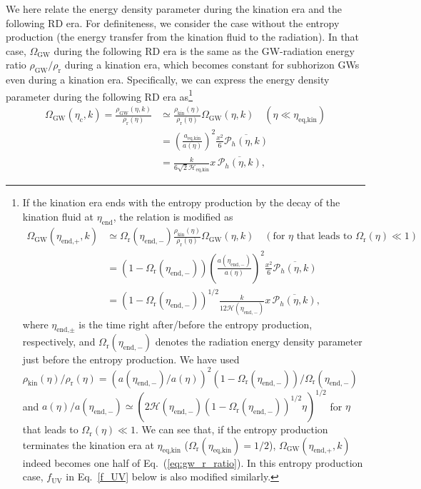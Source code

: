 \documentclass[superscriptaddress, aps, preprintnumbers,
amsmath, amssymb, sort&compress, nofootinbib, 10pt, paper, floatfix]{revtex4-2}
\newcommand{\GW}{\text{GW}}
\newcommand{\en}{{\text{end}}}
\newcommand{\eq}{{\text{eq}}}
\newcommand{\rr}{\text{r}}
\newcommand{\cc}{\text{c}}
\newcommand{\kk}{\text{kin}}
\begin{document}
We here relate the energy density parameter during the kination era and the following RD era. 
For definiteness, we consider the case without the entropy production (the energy transfer from the kination fluid to the radiation). 
In that case, $\Omega_\GW$ during the following RD era is the same as the GW-radiation energy ratio $\rho_\GW/\rho_\rr$ during a kination era, which becomes constant for subhorizon GWs even during a kination era.
Specifically, we can express the energy density parameter during the following RD era as\footnote{If the kination era ends with the entropy production by the decay of the kination fluid at $\eta_\en$, the relation is modified as 
\begin{align}
        \Omega_{\GW}(\eta_\text{end,+},k)
        &\simeq \Omega_\rr(\eta_{\en,-}) \frac{\rho_\kk(\eta)}{\rho_\rr(\eta)} \Omega_\GW(\eta,k) \quad (\text{for } \eta \text{ that leads to } \Omega_\rr(\eta) \ll 1)\nonumber \\
        &= (1-\Omega_\rr(\eta_{\en,-}))\left(\frac{a(\eta_{\en,-})}{a(\eta)} \right)^2\frac{x^2}{6}\overline{\mathcal P_h(\eta,k)} \nonumber \\
         &= (1-\Omega_\rr(\eta_{\en,-}))^{1/2} \frac{k}{12  \mathcal H(\eta_{\en,-})} x\, \overline{\mathcal P_h(\eta,k)},\nonumber
\end{align}
where $\eta_{\text{end,}\pm}$ is the time right after/before the entropy production, respectively, and $\Omega_\rr(\eta_{\en,-})$ denotes the radiation energy density parameter just before the entropy production.
We have used $\rho_\kk(\eta)/\rho_\rr(\eta)= (a(\eta_{\en,-})/a(\eta))^2 (1-\Omega_\rr(\eta_{\en,-}))/\Omega_\rr(\eta_{\en,-})$ and $a(\eta)/a(\eta_{\en,-}) \simeq (2 \mathcal H(\eta_{\en,-}) (1-\Omega_\rr(\eta_{\en,-}))^{1/2}\eta)^{1/2}$ for $\eta$ that leads to  $\Omega_\rr(\eta)\ll 1$.
We can see that, if the entropy production terminates the kination era at $\eta_{\eq,\kk}$ ($\Omega_\rr(\eta_{\eq,\kk}) = 1/2$), $\Omega_\GW(\eta_\text{end,+},k)$ indeed becomes one half of Eq.~(\ref{eq:gw_r_ratio}).
In this entropy production case, $f_\text{UV}$ in Eq.~\eqref{f_UV} below is also modified similarly. 
} 
\begin{align}
         \Omega_{\GW}(\eta_\cc,k) = \frac{\rho_\GW(\eta,k)}{\rho_\rr(\eta)} &\simeq \frac{\rho_\kk(\eta)}{\rho_\rr(\eta)} \Omega_\GW(\eta,k) \quad (\eta \ll \eta_{\eq,\kk})\nonumber \\
         &= \left(\frac{a_{\eq,\kk}}{a(\eta)} \right)^2\frac{x^2}{6}\overline{\mathcal P_h(\eta,k)} \nonumber \\
         &= \frac{k}{6\sqrt{2} \mathcal H_{\eq,\kk}} x\, \overline{\mathcal P_h(\eta,k)},
        \label{eq:gw_r_ratio}
\end{align}
\end{document}
